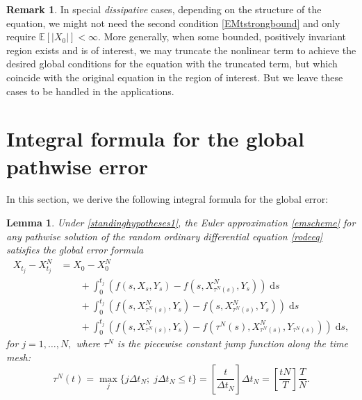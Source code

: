 \documentclass[reqno,12pt]{amsart}
\theoremstyle{plain}%
\newtheorem{lem}{Lemma}[section]
\theoremstyle{definition}
\newtheorem{rmk}{Remark}[section]
\begin{document}
\begin{rmk}
    In special \emph{dissipative} cases, depending on the structure of the equation, we might not need the second condition \eqref{EMtstrongbound} and only require $\mathbb{E}[|X_0|] < \infty$. More generally, when some bounded, positively invariant region exists and is of interest, we may truncate the nonlinear term to achieve the desired global conditions for the equation with the truncated term, but which coincide with the original equation in the region of interest. But we leave these cases to be handled in the applications.
\end{rmk}

\section{Integral formula for the global pathwise error}

In this section, we derive the following integral formula for the global error:
\begin{lem}
    \label{lemglobalerrorintegralformula}
    Under \cref{standinghypotheses1}, the Euler approximation \eqref{emscheme} for any pathwise solution of the random ordinary differential equation \eqref{rodeeq} satisfies the global error formula
    \begin{equation}
        \label{globalerrorintegralformula}
        \begin{aligned}
            X_{t_j} - X_{t_j}^N & = X_0 - X_0^N \\
            & \qquad + \int_0^{t_j} \left( f(s, X_s, Y_s) - f(s, X_{\tau^N(s)}^N, Y_s) \right)\;\mathrm{d}s  \\ 
            & \qquad + \int_{0}^{t_j} \left( f(s, X_{\tau^N(s)}^N, Y_s) - f(s, X_{\tau^N(s)}^N, Y_s) \right)\;\mathrm{d}s \\
            & \qquad + \int_0^{t_j} \left( f(s, X_{\tau^N(s)}^N, Y_s) - f(\tau^N(s), X_{\tau^N(s)}^N, Y_{\tau^N(s)}) \right)\;\mathrm{d}s,
        \end{aligned}
    \end{equation}
    for $j = 1, \ldots, N,$ where $\tau^N$ is the piecewise constant jump function along the time mesh:
    \begin{equation}
        \label{tauNt}
        \tau^N(t) = \max_j\{j\Delta t_N; \; j\Delta t_N \leq t\} = \left[\frac{t}{\Delta t_N}\right]\Delta t_N = \left[\frac{tN}{T}\right]\frac{T}{N}.
    \end{equation}
\end{lem}
\end{document}
